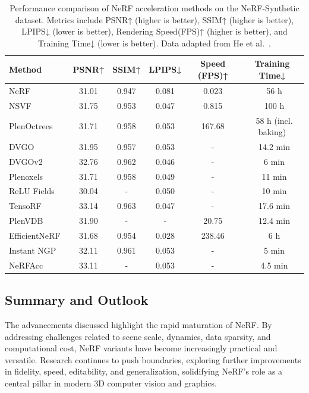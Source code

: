 \begin{table}[t] %
    \centering
    \caption{Performance comparison of NeRF acceleration methods on the NeRF-Synthetic dataset. Metrics include PSNR↑ (higher is better), SSIM↑ (higher is better), LPIPS↓ (lower is better), Rendering Speed(FPS)↑ (higher is better), and Training Time↓ (lower is better). Data adapted from He et al.~\cite{He2024Progress}.}
    \label{tab:nerf_acceleration_comparison} %
    \begin{tabular}{l c c c c c}
      \toprule
      Method & PSNR↑ & SSIM↑ & LPIPS↓ & Speed (FPS)↑ & Training Time↓ \\
      \midrule
      NeRF~\cite{mildenhall2020nerf}        & 31.01 & 0.947 & 0.081 & 0.023 & ~56 h \\
      NSVF~\cite{liu2020nsvf}               & 31.75 & 0.953 & 0.047 & 0.815 & ~100 h \\
      PlenOctrees~\cite{yu2021plenoctrees} & 31.71 & 0.958 & 0.053 & 167.68 & ~58 h (incl. baking) \\
      DVGO~\cite{sun2022dvgo}               & 31.95 & 0.957 & 0.053 & -     & ~14.2 min \\
      DVGOv2~\cite{sun2022dvgo}             & 32.76 & 0.962 & 0.046 & -     & ~6 min \\
      Plenoxels~\cite{fridovichkeil2022plenoxels} & 31.71 & 0.958 & 0.049 & -     & ~11 min \\
      ReLU Fields~\cite{karnewar2022relu}       & 30.04 & -     & 0.050 & -     & ~10 min \\
      TensoRF~\cite{chen2022tensorf}           & 33.14 & 0.963 & 0.047 & -     & ~17.6 min \\
      PlenVDB~\cite{yan2023plenvdb}             & 31.90 & -     & -     & 20.75 & ~12.4 min \\
      EfficientNeRF~\cite{hu2022efficientnerf} & 31.68 & 0.954 & 0.028 & 238.46 & ~6 h \\
      Instant NGP~\cite{mueller2022instant}   & 32.11 & 0.961 & 0.053 & -     & ~5 min \\
      NeRFAcc~\cite{li2023nerfacc}           & 33.11 & -     & 0.053 & -     & ~4.5 min \\
      \bottomrule
    \end{tabular}%
  \end{table}


\subsection{Summary and Outlook}
The advancements discussed highlight the rapid maturation of NeRF. By addressing challenges related to scene scale, dynamics, data sparsity, and computational cost, NeRF variants have become increasingly practical and versatile. Research continues to push boundaries, exploring further improvements in fidelity, speed, editability, and generalization, solidifying NeRF's role as a central pillar in modern 3D computer vision and graphics.

